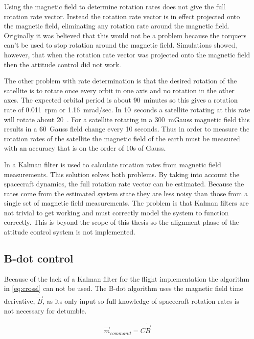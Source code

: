 Using the magnetic field to determine rotation rates does not give the full rotation rate vector. Instead the rotation rate vector is in effect projected onto the magnetic field, eliminating any rotation rate around the magnetic field. Originally it was believed that this would not be a problem because the torquers can't be used to stop rotation around the magnetic field. Simulations showed, however, that when the rotation rate vector was projected onto the magnetic field then the attitude control did not work.

The other problem with rate determination is that the desired rotation of the satellite is to rotate once every orbit in one axis and no rotation in the other axes. The expected orbital period is about 90~minutes so this gives a rotation rate of 0.011~rpm or 1.16~mrad/sec. In 10~seconds a satellite rotating at this rate will rotate about 20~\textmu\textdegree. For a satellite rotating in a 300~mGauss magnetic field this results in a 60~\textmu Gauss field change every 10 seconds. Thus in order to measure the rotation rates of the satellite the magnetic field of the earth must be measured with an accuracy that is on the order of 10s of \textmu Gauss. 

In \cite{Sturm05} a Kalman filter is used to calculate rotation rates from magnetic field measurements. This solution solves both problems. By taking into account the spacecraft dynamics, the full rotation rate vector can be estimated. Because the rates come from the estimated system state they are less noisy than those from a single set of magnetic field measurements. The problem is that Kalman filters are not trivial to get working and must correctly model the system to function correctly. This is beyond the scope of this thesis so the alignment phase of the attitude control system is not implemented.

\subsection{B-dot control}

Because of the lack of a Kalman filter for the flight implementation the algorithm in \cref{eq:crossl} can not be used. The B-dot algorithm uses the magnetic field time derivative, $\dot{\vec{B}}$, as its only input so full knowledge of spacecraft rotation rates is not necessary for detumble.

\begin{equation}
    \vec{m}_{command}= C \dot{\vec{B}}
    \label{eq:bg-bdot}
\end{equation}

